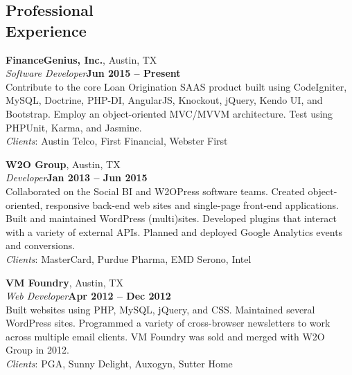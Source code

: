 \documentclass[margin,line]{resume}
\begin{document}
\begin{resume}
\section{\mysidestyle Professional\\Experience}

\textbf{FinanceGenius, Inc.}, Austin, TX
\vspace{2mm}\\
\textsl{Software Developer}\hfill \textbf{Jun 2015 -- Present}\vspace{1mm}\\
Contribute to the core Loan Origination SAAS product built using CodeIgniter, MySQL, Doctrine, PHP-DI, AngularJS, Knockout, jQuery, Kendo UI, and Bootstrap. Employ an object-oriented MVC/MVVM architecture. Test using PHPUnit, Karma, and Jasmine.\vspace{1mm}\\
\textsl{Clients}: {\small Austin Telco, First Financial, Webster First}

\textbf{W2O Group}, Austin, TX
\vspace{2mm}\\
\textsl{Developer}\hfill \textbf{Jan 2013 -- Jun 2015}\vspace{1mm}\\
Collaborated on the Social BI and W2OPress software teams. Created object-oriented, responsive back-end web sites and single-page front-end applications. Built and maintained WordPress (multi)sites. Developed plugins that interact with a variety of external APIs. Planned and deployed Google Analytics events and conversions.\vspace{1mm}\\
\textsl{Clients}: {\small MasterCard, Purdue Pharma, EMD Serono, Intel}

\textbf{VM Foundry}, Austin, TX
\vspace{2mm}\\
\textsl{Web Developer}\hfill \textbf{Apr 2012 -- Dec 2012}\vspace{1mm}\\
Built websites using PHP, MySQL, jQuery, and CSS. Maintained several WordPress sites. Programmed a variety of cross-browser newsletters to work across multiple email clients. VM Foundry was sold and merged with W2O Group in 2012.\vspace{1mm}\\
\textsl{Clients}: {\small PGA, Sunny Delight, Auxogyn, Sutter Home}


\end{resume}
\end{document}
